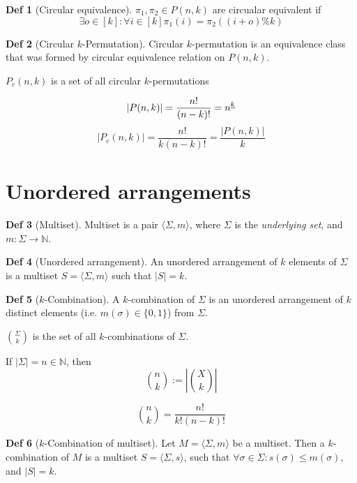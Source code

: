 \documentclass[a4paper]{article}
\theoremstyle{definition}
\newtheorem{definition}{Def}
\begin{document}
\begin{definition}[Circular equivalence]
  \(\pi_1, \pi_2 \in P(n, k)\) are circualar equivalent if
  \[\exists o \in [k] : \forall i \in [k] \pi_1(i) = \pi_2((i + o) \% k) \]
\end{definition}

\begin{definition}[Circular \(k\)-Permutation]
  Circular \(k\)-permutation is an equivalence class that was formed
  by circular equivalence relation on \(P(n, k)\).
\end{definition}

\(P_c(n, k)\) is a set of all circular \(k\)-permutations

\[|P(n, k)| = \frac{n!}{(n - k)!} = {n}^{\underline{k}}\]
\[|P_c(n, k)| = \frac{n!}{k (n - k)!} = \frac{|P(n, k)|}{k}\]

\section{Unordered arrangements}

\begin{definition}[Multiset]
  Multiset is a pair \( \langle \Sigma, m \rangle \),
  where \(\Sigma\) is the \textit{underlying set},
  and \(m : \Sigma \to \mathbb{N}\).
\end{definition}

\begin{definition}[Unordered arrangement]
  An unordered arrangement of \(k\) elements of \(\Sigma\)
  is a multiset \(S = \langle \Sigma, m \rangle\) such that \(|S| = k\).
\end{definition}

\begin{definition}[\(k\)-Combination]
  A \(k\)-combination of \(\Sigma\) is an unordered arrangement of \(k\)
  distinct elements (i.e. \(m(\sigma) \in \{0, 1\}\)) from \(\Sigma\).
\end{definition}

\(\binom{\Sigma}{k}\) is the set of all \(k\)-combinations of \(\Sigma\).

If \(|\Sigma| = n \in \mathbb{N}\), then
\[\binom{n}{k} := \left|\binom{X}{k}\right|\]

\[\binom{n}{k} = \frac{n!}{k!(n-k)!}\]

\begin{definition}[\(k\)-Combination of multiset]
  Let \(M = \langle \Sigma, m \rangle\) be a multiset.
  Then a \(k\)-combination of \(M\) is a multiset
  \(S = \langle \Sigma, s \rangle\), such that
  \(\forall \sigma \in \Sigma : s(\sigma) \le m(\sigma)\),
  and \(|S| = k\).
\end{definition}
\end{document}
